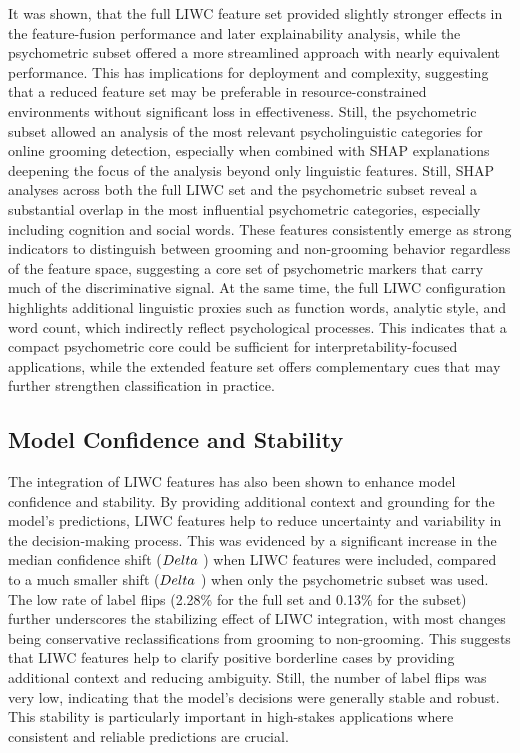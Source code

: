 It was shown, that the full LIWC feature set provided slightly stronger effects in the feature-fusion performance and later explainability analysis, while the psychometric subset offered a more streamlined approach with nearly equivalent performance. This has implications for deployment and complexity, suggesting that a reduced feature set may be preferable in resource-constrained environments without significant loss in effectiveness. Still, the psychometric subset allowed an analysis of the most relevant psycholinguistic categories for online grooming detection, especially when combined with SHAP explanations deepening the focus of the analysis beyond only linguistic features. Still, SHAP analyses across both the full LIWC set and the psychometric subset reveal a substantial overlap in the most influential psychometric categories, especially including cognition and social words. These features consistently emerge as strong indicators to distinguish between grooming and non-grooming behavior regardless of the feature space, suggesting a core set of psychometric markers that carry much of the discriminative signal. At the same time, the full LIWC configuration highlights additional linguistic proxies such as function words, analytic style, and word count, which indirectly reflect psychological processes. This indicates that a compact psychometric core could be sufficient for interpretability-focused applications, while the extended feature set offers complementary cues that may further strengthen classification in practice.

\subsection{Model Confidence and Stability}

The integration of LIWC features has also been shown to enhance model confidence and stability. By providing additional context and grounding for the model's predictions, LIWC features help to reduce uncertainty and variability in the decision-making process. This was evidenced by a significant increase in the median confidence shift ($\\Delta$ \mu  {}) when LIWC features were included, compared to a much smaller shift ($\\Delta$ \mu  {}) when only the psychometric subset was used. The low rate of label flips (2.28\% for the full set and 0.13\% for the subset) further underscores the stabilizing effect of LIWC integration, with most changes being conservative reclassifications from grooming to non-grooming. This suggests that LIWC features help to clarify positive borderline cases by providing additional context and reducing ambiguity. Still, the number of label flips was very low, indicating that the model's decisions were generally stable and robust. This stability is particularly important in high-stakes applications where consistent and reliable predictions are crucial.

